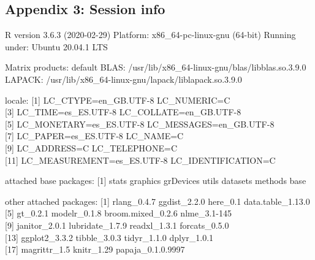 \documentclass[
  english,
  man,man,floatsintext]{apa6}
\begin{document}
\hypertarget{appendix-3-session-info}{%
\subsection{Appendix 3: Session info}\label{appendix-3-session-info}}

R version 3.6.3 (2020-02-29)
Platform: x86\_64-pc-linux-gnu (64-bit)
Running under: Ubuntu 20.04.1 LTS

Matrix products: default
BLAS: /usr/lib/x86\_64-linux-gnu/blas/libblas.so.3.9.0
LAPACK: /usr/lib/x86\_64-linux-gnu/lapack/liblapack.so.3.9.0

locale:
{[}1{]} LC\_CTYPE=en\_GB.UTF-8 LC\_NUMERIC=C\\
{[}3{]} LC\_TIME=es\_ES.UTF-8 LC\_COLLATE=en\_GB.UTF-8\\
{[}5{]} LC\_MONETARY=es\_ES.UTF-8 LC\_MESSAGES=en\_GB.UTF-8\\
{[}7{]} LC\_PAPER=es\_ES.UTF-8 LC\_NAME=C\\
{[}9{]} LC\_ADDRESS=C LC\_TELEPHONE=C\\
{[}11{]} LC\_MEASUREMENT=es\_ES.UTF-8 LC\_IDENTIFICATION=C

attached base packages:
{[}1{]} stats graphics grDevices utils datasets methods base

other attached packages:
{[}1{]} rlang\_0.4.7 ggdist\_2.2.0 here\_0.1 data.table\_1.13.0
{[}5{]} gt\_0.2.1 modelr\_0.1.8 broom.mixed\_0.2.6 nlme\_3.1-145\\
{[}9{]} janitor\_2.0.1 lubridate\_1.7.9 readxl\_1.3.1 forcats\_0.5.0\\
{[}13{]} ggplot2\_3.3.2 tibble\_3.0.3 tidyr\_1.1.0 dplyr\_1.0.1\\
{[}17{]} magrittr\_1.5 knitr\_1.29 papaja\_0.1.0.9997
\end{document}
